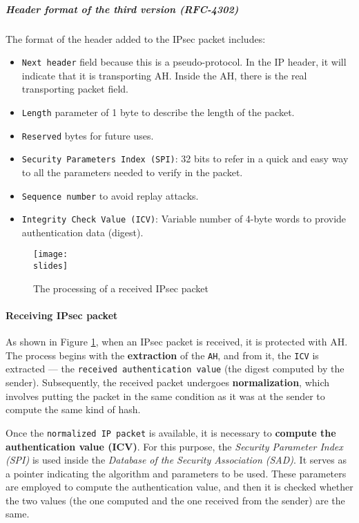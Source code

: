 \subparagraph{Header format of the third version (RFC-4302)}
The format of the header added to the IPsec packet includes:
\begin{itemize}
    \item \texttt{Next header} field because this is a pseudo-protocol. In the IP header, it will indicate that it is transporting AH. Inside the AH, there is the real transporting packet field.
    \item \texttt{Length} parameter of 1 byte to describe the length of the packet.
    \item \texttt{Reserved} bytes for future uses.
    \item \texttt{Security Parameters Index (SPI)}: 32 bits to refer in a quick and easy way to all the parameters needed to verify in the packet.
    \item \texttt{Sequence number} to avoid replay attacks.
    \item \texttt{Integrity Check Value (ICV)}: Variable number of 4-byte words to provide authentication data (digest).
\end{itemize}



\begin{figure}[h]
    \centering
    \texttt{[image: \\slides]}
    \caption{The processing of a received IPsec packet}
    \label{fig:IPsec-receiving-packet}
\end{figure}

\paragraph{Receiving IPsec packet}
As shown in Figure \ref*{fig:IPsec-receiving-packet}, when an IPsec packet is received, it is protected with AH. The process begins with the \textbf{extraction} of the \texttt{AH}, and from it, the  \texttt{ICV} is extracted — the \texttt{received authentication value} (the digest computed by the sender).
Subsequently, the received packet undergoes \textbf{normalization}, which involves putting the packet in the same condition as it was at the sender to compute the same kind of hash.

Once the \texttt{normalized IP packet} is available, it is necessary to \textbf{compute the authentication value (ICV)}. For this purpose, the \textit{Security Parameter Index (SPI)} is used inside the \textit{Database of the Security Association (SAD)}. It serves as a pointer indicating the algorithm and parameters to be used. These parameters are employed to compute the authentication value, and then it is checked whether the two values (the one computed and the one received from the sender) are the same.

